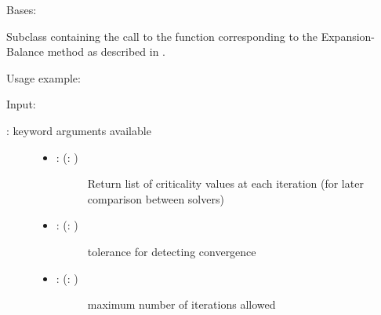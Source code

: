 \documentclass[a4paper,10pt,english]{sphinxmanual}
\begin{document}
\begin{fulllineitems}
\label{\detokenize{skprocrustes:skprocrustes.EBSolver}}
Bases: 

Subclass containing the call to the  function 
corresponding to the Expansion-Balance method as described in 
\label{\detokenize{skprocrustes:id10}}{\hyperref[\detokenize{skprocrustes:bergknol84}]{\sphinxcrossref{{[}tBK84{]}}}}.

Usage example:

\begin{sphinxVerbatim}[commandchars=\\\{\}]
  
  
\end{sphinxVerbatim}

Input:
\begin{description}
\item[{: keyword arguments available}] \leavevmode\begin{itemize}
\item {} \begin{description}
\item[{: (: )}] \leavevmode
Return list of criticality values at each iteration (for later
comparison between solvers)

\end{description}

\item {} \begin{description}
\item[{: (: )}] \leavevmode
tolerance for detecting convergence

\end{description}

\item {} \begin{description}
\item[{: (: )}] \leavevmode
maximum number of iterations allowed


\end{description}
\end{itemize}
\end{description}
\end{fulllineitems}
\end{document}
